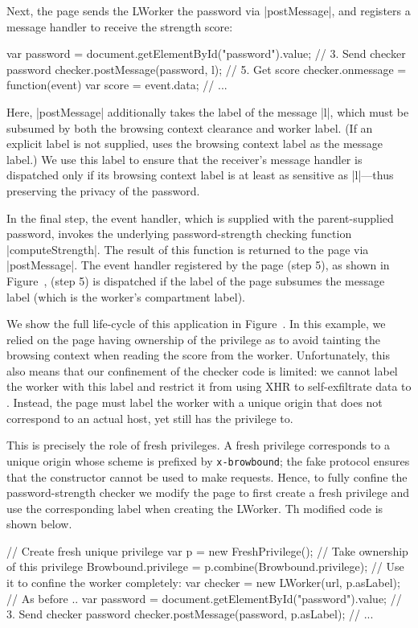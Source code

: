 Next, the page sends the LWorker the
password via \js|postMessage|, and registers a message handler to
receive the strength score:
\begin{jscode}
var password = 
 document.getElementById("password").value;
// 3. Send checker password 
checker.postMessage(password, l);
// 5. Get score
checker.onmessage = function(event) {
  var score = event.data; 
  // ...
}
\end{jscode}
Here, \js|postMessage| additionally takes the label of the message
\js|l|, which must be subsumed by both the browsing context clearance
and worker label.
%
(If an explicit label is not supplied, \sys{} uses the browsing
context label as the message label.)
%
We use this label to ensure that the receiver's message handler is
dispatched only if its browsing context label is at least as sensitive
as \js|l|---thus preserving the privacy of the password.

In the final step, the event handler, which is supplied with the
parent-supplied password, invokes the underlying password-strength
checking function \js|computeStrength|.
%
The result of this function is returned to the page via
\js|postMessage|.
%
The event handler registered by the page 
\iffigures
(step 5), as shown in Figure~, 
\else
(step 5)
\fi
is dispatched if the label of
the page subsumes the message label (which is the worker's compartment
label).

\iffigures
We show the full life-cycle of this application in
Figure~.
\fi
%
In this example, we relied on the page having ownership of the
 privilege as to avoid tainting the browsing
context when reading the score from the worker.
%
Unfortunately, this also means that our confinement of the checker
code is limited: we cannot label the worker with this label and
restrict it from using XHR to self-exfiltrate data to
.
%
Instead, the page must label the worker with a unique origin that does
not correspond to an actual host, yet still has the privilege to.

This is precisely the role of fresh privileges.
%
A fresh privilege corresponds to a unique origin whose scheme is
prefixed by \texttt{x-browbound}; the fake protocol ensures that the
\xhr{} constructor cannot be used to make requests.
%
Hence, to fully confine the password-strength checker we modify the
 page to first create a fresh privilege and use the
corresponding label when creating the LWorker.
%
Th modified code is shown below.
\begin{jscode}
// Create fresh unique privilege
var p = new FreshPrivilege();
// Take ownership of this privilege
Browbound.privilege = p.combine(Browbound.privilege);
// Use it to confine the worker completely:
var checker = new LWorker(url, p.asLabel);
// As before ..
var password = 
 document.getElementById("password").value;
// 3. Send checker password 
checker.postMessage(password, p.asLabel);
// ...
\end{jscode}

